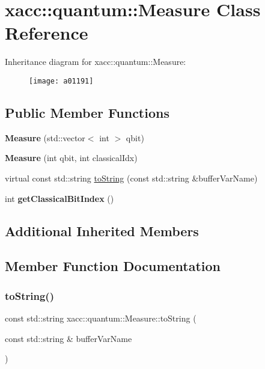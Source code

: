 \hypertarget{a01191}{}\section{xacc\+:\+:quantum\+:\+:Measure Class Reference}
\label{a01191}
Inheritance diagram for xacc\+:\+:quantum\+:\+:Measure\+:\begin{figure}[H]
\begin{center}
\leavevmode
\texttt{[image: a01191]}
\end{center}
\end{figure}
\subsection*{Public Member Functions}
\begin{DoxyCompactItemize}
\item 
\mbox{\label{a01191_afe330a0eea029d842ff9c88a817dcc7d}} 
{\bfseries Measure} (std\+::vector$<$ int $>$ qbit)
\item 
\mbox{\label{a01191_a9b8d9edca8ad2c3fb132780200f17335}} 
{\bfseries Measure} (int qbit, int classical\+Idx)
\item 
virtual const std\+::string \hyperlink{a01191_a1c51a5d68294dcb2ba1a9fbea63a730f}{to\+String} (const std\+::string \&buffer\+Var\+Name)
\item 
\mbox{\label{a01191_a0cb3c94731544042807236ade36fddd0}} 
int {\bfseries get\+Classical\+Bit\+Index} ()
\end{DoxyCompactItemize}
\subsection*{Additional Inherited Members}


\subsection{Member Function Documentation}
\mbox{\label{a01191_a1c51a5d68294dcb2ba1a9fbea63a730f}} 
\subsubsection{\texorpdfstring{to\+String()}{toString()}}
{\footnotesize\ttfamily const std\+::string xacc\+::quantum\+::\+Measure\+::to\+String (\begin{DoxyParamCaption}\item[{const std\+::string \&}]{buffer\+Var\+Name }\end{DoxyParamCaption})\hspace{0.3cm}{\ttfamily [virtual]}}

